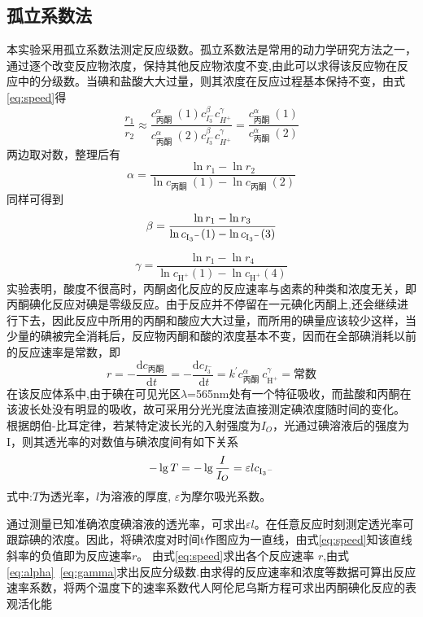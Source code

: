 \documentclass[hyperref,a4paper,UTF8]{ctexart}
\begin{document}
\subsection{孤立系数法}
本实验采用孤立系数法测定反应级数。孤立系数法是常用的动力学研究方法之一，通过逐个改变反应物浓度，保持其他反应物浓度不变,由此可以求得该反应物在反应中的分级数。当碘和盐酸大大过量，则其浓度在反应过程基本保持不变，由式\ref{eq:speed}得
\begin{equation}
\frac{r_1}{r_2} \approx \frac{c_{\text {丙酮 }}^\alpha(1) c_{I_3^{-}}^\beta c_{H^{+}}^\gamma}{c_{\text {丙酮 }}^\alpha(2) c_{I_3^{-}}^\beta c_{H^{+}}^\gamma}=\frac{c_{\text {丙酮 }}^\alpha(1)}{c_{\text {丙酮 }}^\alpha(2)}
\end{equation}
两边取对数，整理后有
\begin{equation}
\alpha=\frac{\ln r_1-\ln r_2}{\ln c_{\text {丙酮 }}(1)-\ln c_{\text {丙酮 }}(2)}
\label{eq:alpha}
\end{equation}
同样可得到
\begin{equation}
\beta=\frac{\ln r_1-\ln r_3}{\ln c_{\ce{I3^-}}(1)-\ln c_{\ce{I3^-}}(3)}
\label{eq:beta}
\end{equation}

\begin{equation}
\gamma=\frac{\ln r_1-\ln r_4}{\ln c_{\mathrm{H}^{+}}(1)-\ln c_{\mathrm{H}^{+}}(4)}
\label{eq:gamma}
\end{equation}
实验表明，酸度不很高时，丙酮卤化反应的反应速率与卤素的种类和浓度无关，即丙酮碘化反应对碘是零级反应。由于反应并不停留在一元碘化丙酮上,还会继续进行下去，因此反应中所用的丙酮和酸应大大过量，而所用的碘量应该较少这样，当少量的碘被完全消耗后，反应物丙酮和酸的浓度基本不变，因而在全部碘消耗以前的反应速率是常数，即
\begin{equation}
r=-\frac{\mathrm{d} c_{\text {丙酮 }}}{\mathrm{d} t}=-\frac{\mathrm{d} c_{I_3^-}}{\mathrm{~d} t}=k^{\prime} c_{\text {丙酮 }}^\alpha c_{\mathrm{H}^{+}}^\gamma=\text{常数}
\end{equation}
在该反应体系中,由于碘在可见光区$\lambda$=565nm处有一个特征吸收，而盐酸和丙酮在该波长处没有明显的吸收，故可采用分光光度法直接测定碘浓度随时间的变化。
根据朗伯-比耳定律，若某特定波长光的入射强度为$I_O$，光通过碘溶液后的强度为I，则其透光率的对数值与碘浓度间有如下关系
\begin{equation}
-\lg T=-\lg \frac{I}{I_O}=\varepsilon l c_{\ce{I3^-}}
\end{equation}
式中:$T$为透光率，$l$为溶液的厚度, $\varepsilon$为摩尔吸光系数。

通过测量已知准确浓度碘溶液的透光率，可求出$\varepsilon l$。在任意反应时刻测定透光率可跟踪碘的浓度。因此，将碘浓度对时间t作图应为一直线，由式\ref{eq:speed}知该直线斜率的负值即为反应速率$r$。
由式\ref{eq:speed}求出各个反应速率 $r$,由式\ref{eq:alpha}~\ref{eq:gamma}求出反应分级数.由求得的反应速率和浓度等数据可算出反应速率系数，将两个温度下的速率系数代人阿伦尼乌斯方程可求出丙酮碘化反应的表观活化能
\end{document}
